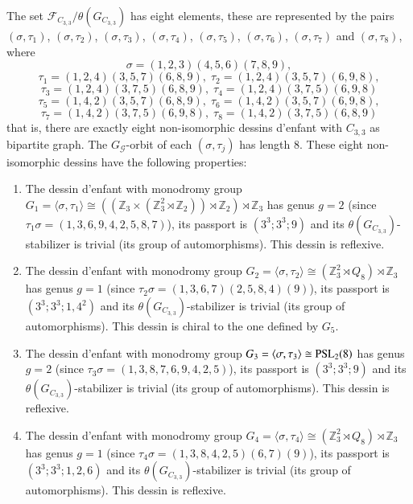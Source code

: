 \documentclass[12pt]{amsart}
\theoremstyle{remark}
\begin{document}
The set ${\mathcal F}_{C_{3,3}}/\theta(G_{C_{3,3}})$ has eight elements, these are represented by the pairs
$(\sigma,\tau_{1})$, $(\sigma,\tau_{2})$, $(\sigma,\tau_{3})$, $(\sigma,\tau_{4})$, $(\sigma,\tau_{5})$, $(\sigma,\tau_{6})$, $(\sigma,\tau_{7})$ and $(\sigma,\tau_{8})$,
where
$$\sigma=(1,2,3)(4,5,6)(7,8,9),$$
$$\tau_{1}=(1,2,4)(3,5,7)(6,8,9), \; \tau_{2}=(1,2,4)(3,5,7)(6,9,8),$$
$$\tau_{3}=(1,2,4)(3,7,5)(6,8,9), \; \tau_{4}=(1,2,4)(3,7,5)(6,9,8)$$
$$\tau_{5}=(1,4,2)(3,5,7)(6,8,9), \; \tau_{6}=(1,4,2)(3,5,7)(6,9,8),$$
$$\tau_{7}=(1,4,2)(3,7,5)(6,9,8), \; \tau_{8}=(1,4,2)(3,7,5)(6,8,9)$$
that is, there are exactly eight non-isomorphic dessins d'enfant with $C_{3,3}$ as bipartite graph. The $G_{\mathcal G}$-orbit of each $(\sigma,\tau_{j})$ has length $8$.
These eight non-isomorphic dessins have the following properties:
\begin{enumerate} 
\item The dessin d'enfant with monodromy group $G_{1}=\langle \sigma,\tau_{1}\rangle \cong (({\mathbb Z}_{3} \times ({\mathbb Z}_{3}^{2} \rtimes {\mathbb Z}_{2})) \rtimes {\mathbb Z}_{2}) \rtimes {\mathbb Z}_{3}$ has genus $g=2$ (since $\tau_{1}\sigma=(1,3,6,9,4,2,5,8,7)$), its passport is $(3^3;3^3;9)$ and its  
$\theta(G_{C_{3,3}})$-stabilizer is trivial (its group of automorphisms). This dessin is reflexive.

\item The dessin d'enfant with monodromy group $G_{2}=\langle \sigma,\tau_{2}\rangle \cong ({\mathbb Z}_{3}^{2} \rtimes Q_{8}) \rtimes {\mathbb Z}_{3}$ has genus  $g=1$ (since $\tau_{2}\sigma=(1,3,6,7)(2,5,8,4)(9)$), its passport is $(3^3;3^3;1,4^2)$ and its $\theta(G_{C_{3,3}})$-stabilizer is trivial (its group of automorphisms). This dessin is chiral to the one defined by $G_5$.

\item The dessin d'enfant with monodromy group $G_{3}=\langle \sigma,\tau_{3}\rangle \cong {\rm PSL}_{2}(8)$ has genus $g=2$ (since $\tau_{3}\sigma=(1,3,8,7,6,9,4,2,5)$), its passport is 
$(3^3;3^3;9)$ and its 
$\theta(G_{C_{3,3}})$-stabilizer is trivial (its group of automorphisms). This dessin is reflexive.

\item The dessin d'enfant with monodromy group $G_{4}=\langle \sigma,\tau_{4}\rangle \cong ({\mathbb Z}_{3}^{2} \rtimes Q_{8}) \rtimes {\mathbb Z}_{3}$ has genus $g=1$ (since $\tau_{4}\sigma=(1,3,8,4,2,5)(6,7)(9)$), its passport is $(3^3;3^3;1,2,6)$ and its
 $\theta(G_{C_{3,3}})$-stabilizer is trivial (its group of automorphisms).  This dessin is reflexive.
 

\end{enumerate}
\end{document}
